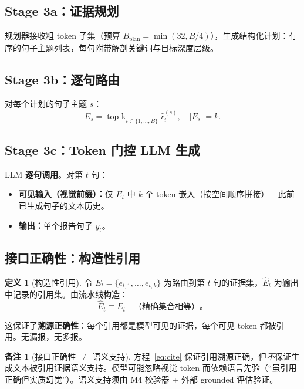 \documentclass[11pt,a4paper]{article}
\theoremstyle{definition}
\newtheorem{definition}{定义}[section]
\newtheorem{remark}{备注}[section]
\begin{document}
\subsection{Stage 3a：证据规划}

规划器接收粗 token 子集（预算 $B_{\mathrm{plan}} = \min(32, B/4)$），生成结构化计划：有序的句子主题列表，每句附带解剖关键词与目标深度层级。

\subsection{Stage 3b：逐句路由}

对每个计划的句子主题 $s$：
\begin{equation}
E_s = \operatorname{top\text{-}k}_{i \in \{1,\ldots,B\}} \hat{r}_i^{(s)}, \quad |E_s| = k.
\end{equation}

\subsection{Stage 3c：Token 门控 LLM 生成}

LLM \textbf{逐句调用}。对第 $t$ 句：
\begin{itemize}
    \item \textbf{可见输入（视觉前缀）：}仅 $E_t$ 中 $k$ 个 token 嵌入（按空间顺序拼接）+ 此前已生成句子的文本历史。
    \item \textbf{输出：}单个报告句子 $y_t$。
\end{itemize}

\subsection{接口正确性：构造性引用}

\begin{definition}[构造性引用]
令 $E_t = \{e_{t,1},\ldots,e_{t,k}\}$ 为路由到第 $t$ 句的证据集，$\hat{E}_t$ 为输出中记录的引用集。由流水线构造：
\begin{equation}\label{eq:cite}
\hat{E}_t \equiv E_t \quad \text{（精确集合相等）}。
\end{equation}
\end{definition}

这保证了\textbf{溯源正确性}：每个引用都是模型可见的证据，每个可见 token 都被引用。无漏报，无多报。

\begin{remark}[接口正确性 $\neq$ 语义支持]
方程~\eqref{eq:cite} 保证引用溯源正确，但\emph{不}保证生成文本被引用证据语义支持。模型可能忽略视觉 token 而依赖语言先验（``虽引用正确但实质幻觉''）。语义支持须由 M4 校验器 + 外部 grounded 评估验证。
\end{remark}
\end{document}
